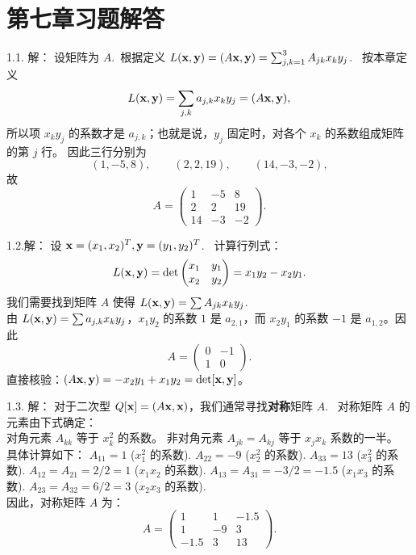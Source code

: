 \section*{第七章习题解答}

\begin{exer}

1.1. 解：
设矩阵为 $A$.~根据定义 $L(\mathbf{x}, \mathbf{y}) = (A\mathbf{x}, \mathbf{y}) = \sum_{j,k=1}^3 A_{jk} x_k y_j$.~
按本章定义
$$L(\mathbf{x},\mathbf{y})=\sum_{j,k}a_{j,k}x_k y_j=(A\mathbf{x},\mathbf{y}),$$
所以项 $x_k y_j$ 的系数才是 $a_{j,k}$；也就是说，$y_j$ 固定时，对各个 $x_k$ 的系数组成矩阵的第 $j$ 行。
因此三行分别为
$$(1,-5,8),\qquad (2,2,19),\qquad (14,-3,-2),$$
故
$$ A = \begin{pmatrix} 1 & -5 & 8 \\ 2 & 2 & 19 \\ 14 & -3 & -2 \end{pmatrix}. $$

1.2.解：
设 $\mathbf{x} = (x_1, x_2)^T, \mathbf{y} = (y_1, y_2)^T$.~
计算行列式：
$$ L(\mathbf{x}, \mathbf{y}) = \det \begin{pmatrix} x_1 & y_1 \\ x_2 & y_2 \end{pmatrix} = x_1 y_2 - x_2 y_1. $$
我们需要找到矩阵 $A$ 使得 $L(\mathbf{x}, \mathbf{y}) = \sum A_{jk} x_k y_j$.~\\
由 $L(\mathbf{x},\mathbf{y})=\sum a_{j,k}x_k y_j$，$x_1y_2$ 的系数 $1$ 是 $a_{2,1}$，而 $x_2y_1$ 的系数 $-1$ 是 $a_{1,2}$。因此
$$ A = \begin{pmatrix} 0 & -1 \\ 1 & 0 \end{pmatrix}. $$
直接核验：$(A\mathbf{x},\mathbf{y})=-x_2y_1+x_1y_2=\det[\mathbf{x},\mathbf{y}]$。

1.3. 解：
对于二次型 $Q[\mathbf{x}] = (A\mathbf{x}, \mathbf{x})$，我们通常寻找\textbf{对称}矩阵 $A$.~
对称矩阵 $A$ 的元素由下式确定：
\\
对角元素 $A_{kk}$ 等于 $x_k^2$ 的系数。
非对角元素 $A_{jk} = A_{kj}$ 等于 $x_j x_k$ 系数的一半。
\\
具体计算如下：
$A_{11} = 1$ ($x_1^2$ 的系数).
$A_{22} = -9$ ($x_2^2$ 的系数).
$A_{33} = 13$ ($x_3^2$ 的系数).
$A_{12} = A_{21} = 2/2 = 1$ ($x_1 x_2$ 的系数).
$A_{13} = A_{31} = -3/2 = -1.5$ ($x_1 x_3$ 的系数).
$A_{23} = A_{32} = 6/2 = 3$ ($x_2 x_3$ 的系数).
\\
因此，对称矩阵 $A$ 为：
$$ A = \begin{pmatrix} 1 & 1 & -1.5 \\ 1 & -9 & 3 \\ -1.5 & 3 & 13 \end{pmatrix}. $$


\end{exer}
